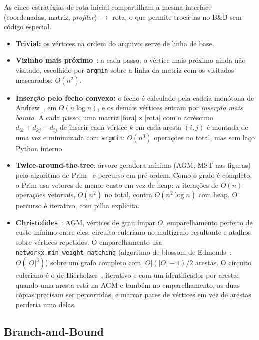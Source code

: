 As cinco estratégias de rota inicial compartilham a mesma interface
(coordenadas, matriz, \emph{profiler}) $\rightarrow$ rota, o que permite trocá-las no B\&B
sem código especial.
\begin{itemize}
  \item \textbf{Trivial:} os vértices na ordem do arquivo; serve de linha de base.
  \item \textbf{Vizinho mais próximo}~\cite{rosenkrantz1977}: a cada passo, o vértice
    mais próximo ainda não visitado, escolhido por \texttt{argmin} sobre a linha da
    matriz com os visitados mascarados; $O(n^2)$.
  \item \textbf{Inserção pelo fecho convexo:} o fecho é calculado pela cadeia monótona de
    Andrew~\cite{andrew1979}, em $O(n \log n)$, e os demais vértices entram por
    \emph{inserção mais barata}. A cada passo, uma matriz
    $|\text{fora}| \times |\text{rota}|$ com o acréscimo
    $d_{ik} + d_{kj} - d_{ij}$ de inserir cada vértice $k$ em cada aresta $(i,j)$ é
    montada de uma vez e minimizada com \texttt{argmin}: $O(n^3)$ operações no total, mas
    sem laço Python interno.
  \item \textbf{Twice-around-the-tree}: árvore geradora mínima (AGM; MST nas figuras) pelo algoritmo de
    Prim~\cite{prim1957} e percurso em pré-ordem. Como o grafo é completo, o Prim usa
    vetores de menor custo em vez de heap: $n$ iterações de $O(n)$ operações vetoriais,
    $O(n^2)$ no total, contra $O(n^2 \log n)$ com heap. O percurso é iterativo, com pilha
    explícita.
  \item \textbf{Christofides}~\cite{christofides1976}: AGM, vértices de grau ímpar
    $O$, emparelhamento perfeito de custo mínimo entre eles, circuito euleriano no
    multigrafo resultante e atalhos sobre vértices repetidos. O emparelhamento usa
    \texttt{networkx.min\_weight\_matching} (algoritmo de blossom de
    Edmonds~\cite{edmonds1965}, $O(|O|^3)$) sobre um grafo completo com $|O|(|O|-1)/2$
    arestas. O circuito euleriano é o de Hierholzer~\cite{hierholzer1873}, iterativo e
    com um identificador por aresta: quando uma aresta está na AGM e também no
    emparelhamento, as duas cópias precisam ser percorridas, e marcar pares de vértices
    em vez de arestas perderia uma delas.
\end{itemize}

\subsection{Branch-and-Bound}\label{sec:bnb}

